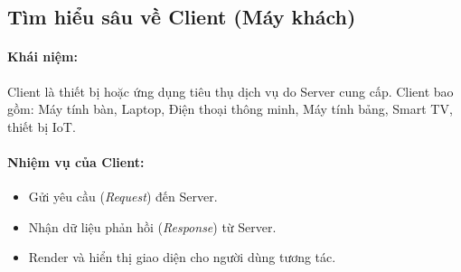 \documentclass[11pt,oneside]{book}
\begin{document}
\subsection{Tìm hiểu sâu về Client (Máy khách)}

\paragraph{Khái niệm:} Client là thiết bị hoặc ứng dụng tiêu thụ dịch vụ do Server cung cấp. Client bao gồm: Máy tính bàn, Laptop, Điện thoại thông minh, Máy tính bảng, Smart TV, thiết bị IoT.

\paragraph{Nhiệm vụ của Client:}
\begin{itemize}
    \item Gửi yêu cầu (\textit{Request}) đến Server.
    \item Nhận dữ liệu phản hồi (\textit{Response}) từ Server.
    \item Render và hiển thị giao diện cho người dùng tương tác.
\end{itemize}
\end{document}
